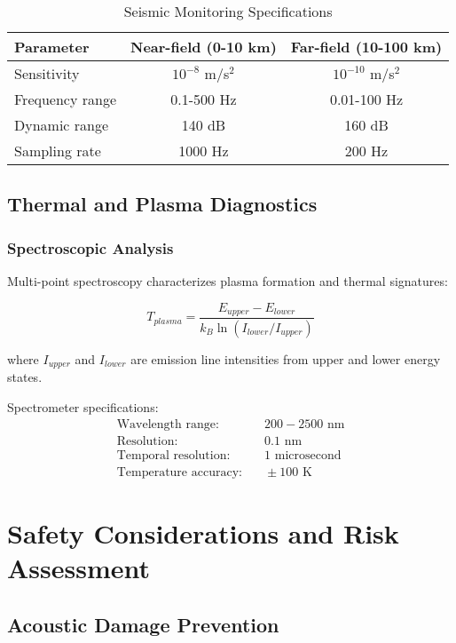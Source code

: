\documentclass[12pt,a4paper]{article}
\begin{document}
\begin{table}[H]
\centering
\caption{Seismic Monitoring Specifications}
\label{tab:seismic_specs}
\begin{tabular}{lcc}
\toprule
Parameter & Near-field (0-10 km) & Far-field (10-100 km) \\
\midrule
Sensitivity & $10^{-8}$ m/s$^2$ & $10^{-10}$ m/s$^2$ \\
Frequency range & 0.1-500 Hz & 0.01-100 Hz \\
Dynamic range & 140 dB & 160 dB \\
Sampling rate & 1000 Hz & 200 Hz \\
\bottomrule
\end{tabular}
\end{table}

\subsection{Thermal and Plasma Diagnostics}

\subsubsection{Spectroscopic Analysis}
Multi-point spectroscopy characterizes plasma formation and thermal signatures:

\begin{equation}
T_{plasma} = \frac{E_{upper} - E_{lower}}{k_B \ln(I_{lower}/I_{upper})}
\label{eq:plasma_temperature}
\end{equation}

where $I_{upper}$ and $I_{lower}$ are emission line intensities from upper and lower energy states.

Spectrometer specifications:
\begin{align}
\text{Wavelength range:} &\quad 200-2500 \text{ nm} \\
\text{Resolution:} &\quad 0.1 \text{ nm} \\
\text{Temporal resolution:} &\quad 1 \text{ microsecond} \\
\text{Temperature accuracy:} &\quad \pm 100 \text{ K}
\end{align}

\section{Safety Considerations and Risk Assessment}

\subsection{Acoustic Damage Prevention}
\end{document}
